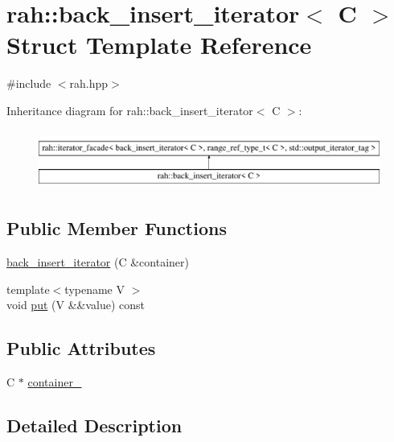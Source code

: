 \hypertarget{structrah_1_1back__insert__iterator}{}\section{rah\+::back\+\_\+insert\+\_\+iterator$<$ C $>$ Struct Template Reference}
\label{structrah_1_1back__insert__iterator}


{\ttfamily \#include $<$rah.\+hpp$>$}

Inheritance diagram for rah\+::back\+\_\+insert\+\_\+iterator$<$ C $>$\+:\begin{figure}[H]
\begin{center}
\leavevmode
\includegraphics[height=1.947826cm]{structrah_1_1back__insert__iterator}
\end{center}
\end{figure}
\subsection*{Public Member Functions}
\begin{DoxyCompactItemize}
\item 
\mbox{\hyperlink{structrah_1_1back__insert__iterator_a7c208b6bee5af4ca1f87a0a52df8069c}{back\+\_\+insert\+\_\+iterator}} (C \&container)
\item 
{\footnotesize template$<$typename V $>$ }\\void \mbox{\hyperlink{structrah_1_1back__insert__iterator_a5af149b87aebf5ced8a4143afe79ad50}{put}} (V \&\&value) const
\end{DoxyCompactItemize}
\subsection*{Public Attributes}
\begin{DoxyCompactItemize}
\item 
C $\ast$ \mbox{\hyperlink{structrah_1_1back__insert__iterator_a9abb383f80748b5baba2ecd6bff83056}{container\+\_\+}}
\end{DoxyCompactItemize}


\subsection{Detailed Description}

